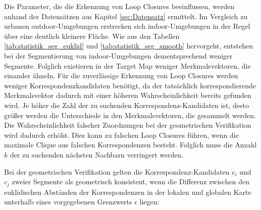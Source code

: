 Die Parameter, die die Erkennung von Loop Closures beeinflussen, werden anhand der Datensätzen aus Kapitel \ref{sec:Datensatz} ermittelt. Im Vergleich zu urbanen outdoor-Umgebungen erstrecken sich indoor-Umgebungen in der Regel über eine deutlich \linebreak kleinere Fläche. Wie aus den Tabellen \ref{tab:statistik_seg_euklid} und \ref{tab:statistik_seg_smooth} hervorgeht, entstehen bei der Segmentierung von indoor-Umgebungen dementsprechend weniger Segmente. Folglich existieren in der Target Map weniger Merkmalsvektoren, die einander ähneln. Für die zuverlässige Erkennung von Loop Closures werden weniger Korrespondenzkandidaten benötigt, da der tatsächlich korrespondierende Merkmalsvektor dadurch mit einer höheren Wahrscheinlichkeit bereits gefunden wird. Je höher die Zahl der zu suchenden Korrespondenz-Kandidaten ist, desto größer werden die Unterschiede in den Merkmalsvektoren, die gesammelt werden. Die Wahrscheinlichkeit falscher Zuordnungen bei der geometrischen Verifikation wird dadurch erhöht. Dies kann zu falschen Loop Closures führen, wenn die maximale Clique aus falschen Korrespondenzen besteht. Folglich muss die Anzahl $k$ der zu suchenden nächsten Nachbarn verringert werden. 


Bei der geometrischen Verifikation gelten die Korrespondenz-Kandidaten $c_i $ und $ c_j $ zweier Segmente als geometrisch konsistent, wenn die Differenz zwischen den eu\-kli\-disch\-en Abständen der Korrespondenzen in der lokalen und globalen Karte unterhalb eines vorgegebenen Grenzwerts $\epsilon$ liegen:

